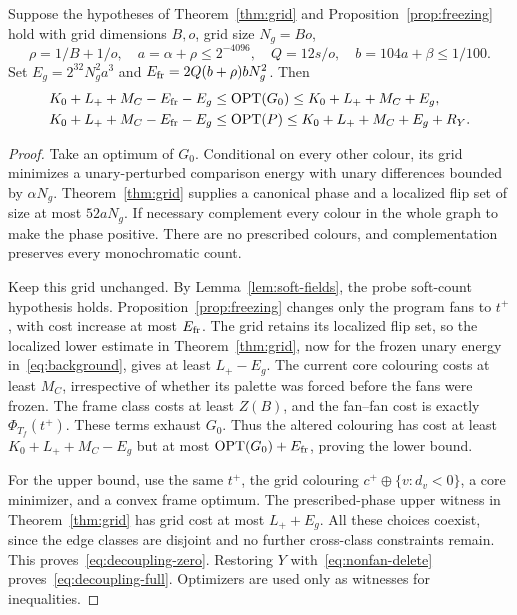 \begin{proposition}\label{prop:decoupling}
Suppose the hypotheses of Theorem~\ref{thm:grid} and Proposition~\ref{prop:freezing} hold with grid dimensions $B,o$, grid size $N_g=Bo$,
\[
\rho=1/B+1/o,\quad a=\alpha+\rho\leq2^{-4096},\quad
Q=12s/o,\quad b=104a+\beta\leq1/100.
\]
Set $E_g=2^{32}N_g^2a^3$ and $E_{\rm fr}=2Q(b+\rho)bN_g^2$. Then
\begin{align}
K_0+L_++M_C-E_{\rm fr}-E_g
&\leq\operatorname{OPT}(G_0)\leq K_0+L_++M_C+E_g,\label{eq:decoupling-zero}\\
K_0+L_++M_C-E_{\rm fr}-E_g
&\leq\operatorname{OPT}(P)\leq K_0+L_++M_C+E_g+R_Y.
\label{eq:decoupling-full}
\end{align}
\end{proposition}
\begin{proof}
Take an optimum of $G_0$. Conditional on every other colour, its grid minimizes a unary-perturbed comparison energy with unary differences bounded by $\alpha N_g$. Theorem~\ref{thm:grid} supplies a canonical phase and a localized flip set of size at most $52aN_g$. If necessary complement every colour in the whole graph to make the phase positive. There are no prescribed colours, and complementation preserves every monochromatic count.

Keep this grid unchanged. By Lemma~\ref{lem:soft-fields}, the probe soft-count hypothesis holds. Proposition~\ref{prop:freezing} changes only the program fans to $t^+$, with cost increase at most $E_{\rm fr}$. The grid retains its localized flip set, so the localized lower estimate in Theorem~\ref{thm:grid}, now for the frozen unary energy in~\eqref{eq:background}, gives at least $L_+-E_g$. The current core colouring costs at least $M_C$, irrespective of whether its palette was forced before the fans were frozen. The frame class costs at least $Z(B)$, and the fan--fan cost is exactly $\Phi_{T_f}(t^+)$. These terms exhaust $G_0$. Thus the altered colouring has cost at least $K_0+L_++M_C-E_g$ but at most $\operatorname{OPT}(G_0)+E_{\rm fr}$, proving the lower bound.

For the upper bound, use the same $t^+$, the grid colouring
$c^+\oplus\{v:d_v<0\}$, a core minimizer, and a convex frame optimum. The prescribed-phase upper witness in Theorem~\ref{thm:grid} has grid cost at most $L_++E_g$. All these choices coexist, since the edge classes are disjoint and no further cross-class constraints remain. This proves~\eqref{eq:decoupling-zero}. Restoring $Y$ with~\eqref{eq:nonfan-delete} proves~\eqref{eq:decoupling-full}. Optimizers are used only as witnesses for inequalities.
\end{proof}

